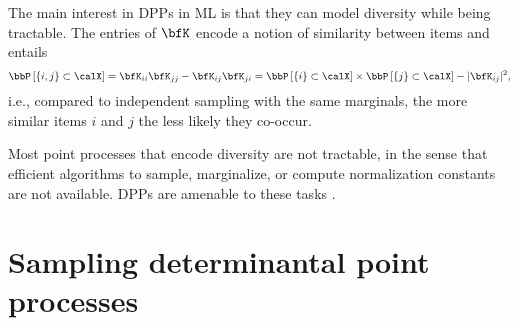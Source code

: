 \documentclass[twoside,11pt]{article}
\begin{document}
        The main interest in DPPs in ML is that they can model diversity while being tractable.
        The entries of $\bfK$ encode a notion of similarity between items and  entails
        \begin{equation*}
        \label{eq:2point_correlation_function_inclusion_proba_finite_case}
          \Proba{\{i,j\} \subset \calX}
            = {\bfK}_{ii}{\bfK}_{jj}-{\bfK}_{ij}{\bfK}_{ji}
            = \Proba{\{i\} \subset \calX}
              \times \Proba{\{j\} \subset \calX}
                - |{\bfK}_{ij}|^2,
        \end{equation*}
        i.e., compared to independent sampling with the same marginals, the more similar items $i$ and $j$ the less likely they co-occur.

        Most point processes that encode diversity are not tractable, in the sense that efficient algorithms to sample, marginalize, or compute normalization constants are not available.
        DPPs are amenable to these tasks \citep{KuTa12,Gil14}.


    \section{Sampling determinantal point processes} %
    \label{sec:sampling}
\end{document}

